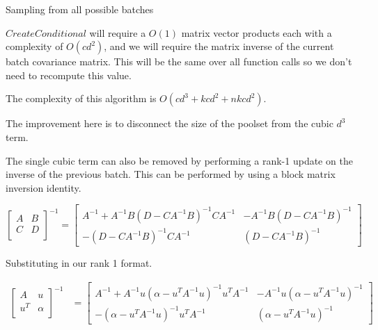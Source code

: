 \documentclass[12pt, a4paper]{report}
\theoremstyle{definition}
\theoremstyle{definition}
\theoremstyle{definition}
\begin{document}
\begin{algorithm}[H]
    \SetAlgoLined
     \caption{Sampling from all possible batches}
\end{algorithm}

$CreateConditional$ will require a $O(1)$ matrix vector products each with a complexity of $O(cd^2)$, and we will require the matrix inverse of the current batch covariance matrix. This will be the same over all function calls so we don't need to recompute this value.

The complexity of this algorithm is $O\left(cd^3 + kcd^2 + nkcd^2 \right)$.

The improvement here is to disconnect the size of the poolset from the cubic $d^3$ term.

The single cubic term can also be removed by performing a rank-1 update on the inverse of the previous batch. This can be performed by using a block matrix inversion identity.

$$\begin{bmatrix}
    A & B \\
    C & D \\
\end{bmatrix}^{-1} = \begin{bmatrix}
    A^{-1} + A^{-1} B \left(D - C A^{-1} B \right)^{-1} C A^{-1} & -A^{-1} B \left( D - C A^{-1}B\right)^{-1} \\
    - \left(D - CA^{-1}B \right)^{-1} C A^{-1} & \left(D - C A^{-1} B\right)^{-1}
\end{bmatrix} $$ 

Substituting in our rank 1 format.

\begin{align*}
    \begin{bmatrix}
        A & u \\
        u^T & \alpha \\
    \end{bmatrix}^{-1} &= \begin{bmatrix}
        A^{-1} + A^{-1} u \left(\alpha - u^T A^{-1} u \right)^{-1} u^T  A^{-1} & -A^{-1} u \left( \alpha - u^T A^{-1}u\right)^{-1} \\
        - \left(\alpha - u^T A^{-1}u \right)^{-1} u^T A^{-1} & \left(\alpha - u^T A^{-1} u\right)^{-1}
    \end{bmatrix}
\end{align*}
\end{document}
